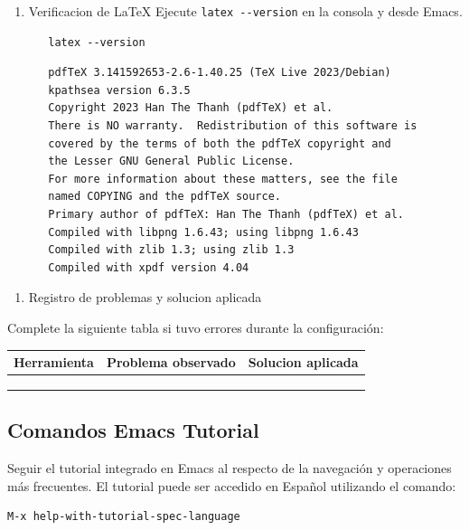 \documentclass{article}
\begin{document}
\begin{enumerate}
\item Verificacion de \LaTeX{}
Ejecute \texttt{latex -{}-{}version} en la consola y desde Emacs.

\begin{verbatim}
   latex --version
\end{verbatim}

\begin{verbatim}
   pdfTeX 3.141592653-2.6-1.40.25 (TeX Live 2023/Debian)
   kpathsea version 6.3.5
   Copyright 2023 Han The Thanh (pdfTeX) et al.
   There is NO warranty.  Redistribution of this software is
   covered by the terms of both the pdfTeX copyright and
   the Lesser GNU General Public License.
   For more information about these matters, see the file
   named COPYING and the pdfTeX source.
   Primary author of pdfTeX: Han The Thanh (pdfTeX) et al.
   Compiled with libpng 1.6.43; using libpng 1.6.43
   Compiled with zlib 1.3; using zlib 1.3
   Compiled with xpdf version 4.04
\end{verbatim}
\end{enumerate}


\begin{enumerate}
\item Registro de problemas y solucion aplicada
\end{enumerate}

Complete la siguiente tabla si tuvo errores durante la configuración:

\begin{center}
\begin{tabularx}{\textwidth}{lXX}
\textbf{Herramienta} & \textbf{Problema observado} & \textbf{Solucion aplicada}\\[0pt]
\hline
 &  & \\[0pt]
 &  & \\[0pt]
 &  & \\[0pt]
\end{tabularx}
\end{center}

\subsection{Comandos Emacs Tutorial}
\label{sec:orgcbad93c}
Seguir el tutorial integrado en Emacs al respecto de la navegación y
operaciones más frecuentes. El tutorial puede ser accedido en Español
utilizando el comando:

\begin{verbatim}
M-x help-with-tutorial-spec-language
\end{verbatim}
\end{document}
